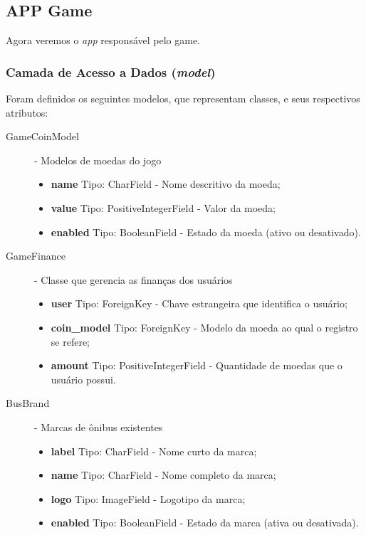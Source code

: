 \clearpage
\subsection{APP Game}
Agora veremos o \textit{app} responsável pelo game.
\subsubsection{Camada de Acesso a Dados (\textit{model})}
Foram definidos os seguintes modelos, que representam classes, e seus respectivos atributos:
\begin{description}
    \item[GameCoinModel] - Modelos de moedas do jogo
        \begin{itemize}
            \item \textbf{name} Tipo: CharField - Nome descritivo da moeda;
            \item \textbf{value} Tipo: PositiveIntegerField - Valor da moeda;
            \item \textbf{enabled} Tipo: BooleanField - Estado da moeda (ativo ou desativado).
        \end{itemize}
    \item[GameFinance] - Classe que gerencia as finanças dos usuários
        \begin{itemize}
            \item \textbf{user} Tipo: ForeignKey - Chave estrangeira que identifica o usuário;
            \item \textbf{coin\_model} Tipo: ForeignKey - Modelo da moeda ao qual o registro se refere;
            \item \textbf{amount} Tipo: PositiveIntegerField - Quantidade de moedas que o usuário possui.
        \end{itemize}
    \item[BusBrand] - Marcas de ônibus existentes
        \begin{itemize}
            \item \textbf{label} Tipo: CharField - Nome curto da marca;
            \item \textbf{name} Tipo: CharField - Nome completo da marca;
            \item \textbf{logo} Tipo: ImageField - Logotipo da marca;
            \item \textbf{enabled} Tipo: BooleanField - Estado da marca (ativa ou desativada).

\end{itemize}
\end{description}
